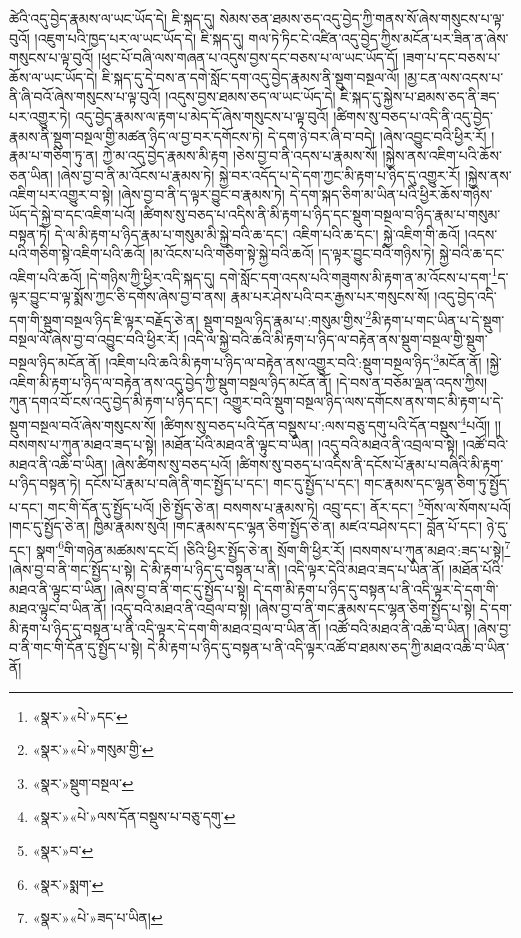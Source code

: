 ཚེའི་འདུ་བྱེད་རྣམས་ལ་ཡང་ཡོད་དེ། ཇི་སྐད་དུ། སེམས་ཅན་ཐམས་ཅད་འདུ་བྱེད་ཀྱི་གནས་སོ་ཞེས་གསུངས་པ་ལྟ་བུའོ། །འཇུག་པའི་ཁྱད་པར་ལ་ཡང་ཡོད་དེ། ཇི་སྐད་དུ། གལ་ཏེ་ཏིང་ངེ་འཛིན་འདུ་བྱེད་ཀྱིས་མངོན་པར་ཟིན་ན་ཞེས་གསུངས་པ་ལྟ་བུའོ། །ཕུང་པོ་བཞི་ལས་གཞན་པ་འདུས་བྱས་དང་བཅས་པ་ལ་ཡང་ཡོད་དོ། །ཟག་པ་དང་བཅས་པ་ཆོས་ལ་ཡང་ཡོད་དེ། ཇི་སྐད་དུ་དེ་བས་ན་དགེ་སློང་དག་འདུ་བྱེད་རྣམས་ནི་སྡུག་བསྔལ་ལོ། །མྱ་ངན་ལས་འདས་པ་ནི་ཞི་བའོ་ཞེས་གསུངས་པ་ལྟ་བུའོ། །འདུས་བྱས་ཐམས་ཅད་ལ་ཡང་ཡོད་དེ། ཇི་སྐད་དུ་སྐྱེས་པ་ཐམས་ཅད་ནི་ཟད་པར་འགྱུར་ཏེ། འདུ་བྱེད་རྣམས་ལ་རྟག་པ་མེད་དོ་ཞེས་གསུངས་པ་ལྟ་བུའོ། །ཚིགས་སུ་བཅད་པ་འདི་ནི་འདུ་བྱེད་རྣམས་ནི་སྡུག་བསྔལ་གྱི་མཚན་ཉིད་ལ་བྱ་བར་དགོངས་ཏེ། དེ་དག་ཉེ་བར་ཞི་བ་བདེ། །ཞེས་འབྱུང་བའི་ཕྱིར་རོ། །རྣམ་པ་གཅིག་ཏུ་ན། ཀྱེ་མ་འདུ་བྱེད་རྣམས་མི་རྟག །ཅེས་བྱ་བ་ནི་འདས་པ་རྣམས་སོ། །སྐྱེས་ནས་འཇིག་པའི་ཆོས་ཅན་ཡིན། །ཞེས་བྱ་བ་ནི་མ་འོངས་པ་རྣམས་ཏེ། སྐྱེ་བར་འདོད་པ་དེ་དག་ཀྱང་མི་རྟག་པ་ཉིད་དུ་འགྱུར་རོ། །སྐྱེས་ནས་འཇིག་པར་འགྱུར་བ་སྟེ། །ཞེས་བྱ་བ་ནི་ད་ལྟར་བྱུང་བ་རྣམས་ཏེ། དེ་དག་སྐད་ཅིག་མ་ཡིན་པའི་ཕྱིར་ཆོས་གཉིས་ཡོད་དེ་སྐྱེ་བ་དང་འཇིག་པའོ། །ཚིགས་སུ་བཅད་པ་འདིས་ནི་མི་རྟག་པ་ཉིད་དང་སྡུག་བསྔལ་བ་ཉིད་རྣམ་པ་གསུམ་བསྟན་ཏེ། དེ་ལ་མི་རྟག་པ་ཉིད་རྣམ་པ་གསུམ་མི་སྐྱེ་བའི་ཆ་དང་། འཇིག་པའི་ཆ་དང་། སྐྱེ་འཇིག་གི་ཆའོ། །འདས་པའི་གཅིག་སྟེ་འཇིག་པའི་ཆའོ། །མ་འོངས་པའི་གཅིག་སྟེ་སྐྱེ་བའི་ཆའོ། །ད་ལྟར་བྱུང་བའི་གཉིས་ཏེ། སྐྱེ་བའི་ཆ་དང་འཇིག་པའི་ཆའོ། །དེ་གཉིས་ཀྱི་ཕྱིར་འདི་སྐད་དུ། དགེ་སློང་དག་འདས་པའི་གཟུགས་མི་རྟག་ན་མ་འོངས་པ་དག་\footnote{«སྣར་»«པེ་»དང་}ད་ལྟར་བྱུང་བ་ལྟ་སྨོས་ཀྱང་ཅི་དགོས་ཞེས་བྱ་བ་ནས། རྣམ་པར་ཤེས་པའི་བར་རྒྱས་པར་གསུངས་སོ། །འདུ་བྱེད་འདི་དག་གི་སྡུག་བསྔལ་ཉིད་ཇི་ལྟར་བརྗོད་ཅེ་ན། སྡུག་བསྔལ་ཉིད་རྣམ་པ་:གསུམ་གྱིས་\footnote{«སྣར་»«པེ་»གསུམ་གྱི་}མི་རྟག་པ་གང་ཡིན་པ་དེ་སྡུག་བསྔལ་ལོ་ཞེས་བྱ་བ་འབྱུང་བའི་ཕྱིར་རོ། །འདི་ལ་སྐྱེ་བའི་ཆའི་མི་རྟག་པ་ཉིད་ལ་བརྟེན་ནས་སྡུག་བསྔལ་གྱི་སྡུག་བསྔལ་ཉིད་མངོན་ནོ། །འཇིག་པའི་ཆའི་མི་རྟག་པ་ཉིད་ལ་བརྟེན་ནས་འགྱུར་བའི་:སྡུག་བསྔལ་ཉིད་\footnote{«སྣར་»སྡུག་བསྔལ་}མངོན་ནོ། །སྐྱེ་འཇིག་མི་རྟག་པ་ཉིད་ལ་བརྟེན་ནས་འདུ་བྱེད་ཀྱི་སྡུག་བསྔལ་ཉིད་མངོན་ནོ། །དེ་བས་ན་བཅོམ་ལྡན་འདས་ཀྱིས། ཀུན་དགའ་བོ་ངས་འདུ་བྱེད་མི་རྟག་པ་ཉིད་དང་། འགྱུར་བའི་སྡུག་བསྔལ་ཉིད་ལས་དགོངས་ནས་གང་མི་རྟག་པ་དེ་སྡུག་བསྔལ་བའོ་ཞེས་གསུངས་སོ། །ཚིགས་སུ་བཅད་པའི་དོན་བསྡུས་པ་:ལས་བཅུ་དགུ་པའི་དོན་བསྡུས་\footnote{«སྣར་»«པེ་»ལས་དོན་བསྡུས་པ་བཅུ་དགུ་}པའོ།། །།བསགས་པ་ཀུན་མཐའ་ཟད་པ་སྟེ། །མཐོན་པོའི་མཐའ་ནི་ལྟུང་བ་ཡིན། །འདུ་བའི་མཐའ་ནི་འབྲལ་བ་སྟེ། །འཚོ་བའི་མཐའ་ནི་འཆི་བ་ཡིན། །ཞེས་ཚིགས་སུ་བཅད་པའོ། །ཚིགས་སུ་བཅད་པ་འདིས་ནི་དངོས་པོ་རྣམ་པ་བཞིའི་མི་རྟག་པ་ཉིད་བསྟན་ཏེ། དངོས་པོ་རྣམ་པ་བཞི་ནི་གང་སྤྱོད་པ་དང་། གང་དུ་སྤྱོད་པ་དང་། གང་རྣམས་དང་ལྷན་ཅིག་ཏུ་སྤྱོད་པ་དང་། གང་གི་དོན་དུ་སྤྱོད་པའོ། །ཅི་སྤྱོད་ཅེ་ན། བསགས་པ་རྣམས་ཏེ། འབྲུ་དང་། ནོར་དང་། \footnote{«སྣར་»བ་}གོས་ལ་སོགས་པའོ། །གང་དུ་སྤྱོད་ཅེ་ན། ཁྱིམ་རྣམས་སུའོ། །གང་རྣམས་དང་ལྷན་ཅིག་སྤྱོད་ཅེ་ན། མཛའ་བཤེས་དང་། བློན་པོ་དང་། ཉེ་དུ་དང་། སྣག་\footnote{«སྣར་»སྨག་}གི་གཉེན་མཚམས་དང་ངོ། །ཅིའི་ཕྱིར་སྤྱོད་ཅེ་ན། སྲོག་གི་ཕྱིར་རོ། །བསགས་པ་ཀུན་མཐའ་:ཟད་པ་སྟེ།\footnote{«སྣར་»«པེ་»ཟད་པ་ཡིན།} །ཞེས་བྱ་བ་ནི་གང་སྤྱོད་པ་སྟེ། དེ་མི་རྟག་པ་ཉིད་དུ་བསྟན་པ་ནི། །འདི་ལྟར་དེའི་མཐའ་ཟད་པ་ཡིན་ནོ། །མཐོན་པོའི་མཐའ་ནི་ལྟུང་བ་ཡིན། །ཞེས་བྱ་བ་ནི་གང་དུ་སྤྱོད་པ་སྟེ། དེ་དག་མི་རྟག་པ་ཉིད་དུ་བསྟན་པ་ནི་འདི་ལྟར་དེ་དག་གི་མཐའ་ལྟུང་བ་ཡིན་ནོ། །འདུ་བའི་མཐའ་ནི་འབྲལ་བ་སྟེ། །ཞེས་བྱ་བ་ནི་གང་རྣམས་དང་ལྷན་ཅིག་སྤྱོད་པ་སྟེ། དེ་དག་མི་རྟག་པ་ཉིད་དུ་བསྟན་པ་ནི་འདི་ལྟར་དེ་དག་གི་མཐའ་བྲལ་བ་ཡིན་ནོ། །འཚོ་བའི་མཐའ་ནི་འཆི་བ་ཡིན། །ཞེས་བྱ་བ་ནི་གང་གི་དོན་དུ་སྤྱོད་པ་སྟེ། དེ་མི་རྟག་པ་ཉིད་དུ་བསྟན་པ་ནི་འདི་ལྟར་འཚོ་བ་ཐམས་ཅད་ཀྱི་མཐའ་འཆི་བ་ཡིན་ནོ། 